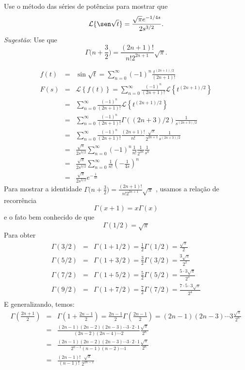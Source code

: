 \begin{exer}
Use o método das séries de potências para mostrar que \[\mathcal{L} \{\sen \sqrt{t} \} =  \frac{\sqrt{\pi} e^{-1/4s}}{2s^{3/2}}.\]
\emph{Sugestão}: Use que \[\Gamma\bigg( n + \frac{3}{2} \bigg) = \frac{ (2n+1)!}{ n! 2^{2n+1}}\sqrt{\pi}.\]
\end{exer}
\begin{resp}
 \begin{eqnarray*}
f(t)&=&\sin\sqrt{t}= \sum_{n=0}^{\infty}(-1)^n\frac{t^{(2n+1)/2}}{(2n+1)!}\\
F(s)&=&\mathcal{L}\left\{f(t)\right\}=\sum_{n=0}^{\infty}\frac{(-1)^n}{{(2n+1)!}}\mathcal{L}\left\{{t^{(2n+1)/2}}\right\}\\
&=&\sum_{n=0}^{\infty}\frac{(-1)^n}{{(2n+1)!}}\mathcal{L}\left\{{t^{(2n+1)/2}}\right\}\\
&=&\sum_{n=0}^{\infty}\frac{(-1)^n}{{(2n+1)!}}\Gamma\left((2n+3)/2\right)\frac{1}{s^{(2n+3)/2}}\\
&=&\sum_{n=0}^{\infty}\frac{(-1)^n}{{(2n+1)!}}\frac{(2n+1)!}{n!}\frac{\sqrt{\pi}}{2^{2n+1}}\frac{1}{s^{(2n+3)/2}}\\
&=&\frac{\sqrt{\pi}}{2s^{3/2}}\sum_{n=0}^{\infty}{(-1)^n}\frac{1}{n!}\frac{1}{2^{2n}}\frac{1}{s^{n}}\\
&=&\frac{\sqrt{\pi}}{2s^{3/2}}\sum_{n=0}^{\infty}\frac{1}{n!}{\left(-\frac{1}{4s}\right)^{n}}\\
&=&\frac{\sqrt{\pi}}{2s^{3/2}}e^{-\frac{1}{4s}}
\end{eqnarray*}
Para mostrar a identidade $\Gamma\bigg( n + \frac{3}{2} \bigg) = \frac{ (2n+1)!}{ n! 2^{2n+1}}\sqrt{\pi}$ , usamos a relação de recorrência
\begin{equation}\Gamma(x+1)=x\Gamma(x)\end{equation}
e o fato bem conhecido  de que
\begin{equation}\Gamma(1/2)=\sqrt{\pi}\end{equation}
Para obter
\begin{eqnarray*}
\Gamma(3/2)&=&\Gamma(1+1/2)=\frac{1}{2}\Gamma(1/2)=\frac{\sqrt{\pi}}{2}\\
\Gamma(5/2)&=&\Gamma(1+3/2)=\frac{3}{2}\Gamma(3/2)=\frac{3\sqrt{\pi}}{2^2}\\
\Gamma(7/2)&=&\Gamma(1+5/2)=\frac{5}{2}\Gamma(5/2)=\frac{5 \cdot 3\sqrt{\pi}}{2^3}\\
\Gamma(9/2)&=&\Gamma(1+7/2)=\frac{7}{2}\Gamma(7/2)=\frac{7\cdot 5 \cdot 3\sqrt{\pi}}{2^4}\\
\end{eqnarray*}
E generalizando, temos:
\begin{eqnarray*}
\Gamma\left(\frac{2n+1}{2}\right)&=&\Gamma\left(1+\frac{2n-1}{2}\right)=\frac{2n-1}{2}\Gamma\left(\frac{2n-1}{2}\right)={(2n-1)(2n-3)\cdots 3}\frac{\sqrt{\pi}}{2^{n}}\\
&=&\frac{(2n-1)(2n-2)(2n-3)\cdots 3\cdot 2 \cdot 1}{(2n-2)(2n-4)\cdots 2}\frac{\sqrt{\pi}}{2^{n}}\\
&=&\frac{(2n-1)(2n-2)(2n-3)\cdots 3\cdot 2 \cdot 1}{2^{n-1}(n-1)(n-2)\cdots 1}\frac{\sqrt{\pi}}{2^{n}}\\
&=&\frac{(2n-1)!}{(n-1)!}\frac{\sqrt{\pi}}{2^{2n-1}}
\end{eqnarray*}
\end{resp}

